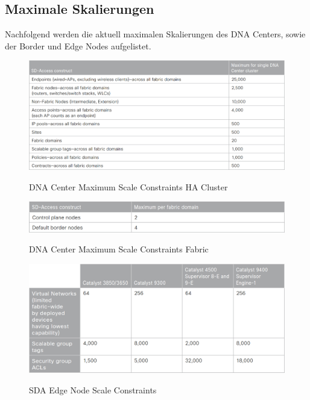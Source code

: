 \subsection{Maximale Skalierungen}
Nachfolgend werden die aktuell maximalen Skalierungen des DNA Centers, sowie der Border und Edge Nodes aufgelistet.
\begin{figure}[H]
	\centering
	\includegraphics[width=1\linewidth]{img/MaximumScale-HACluster.png}\\[1px]
	\caption{DNA Center Maximum Scale Constraints HA Cluster}
	\label{fig:Maximum Scale HACluster}
\end{figure}

\begin{figure}[H]
	\centering
	\includegraphics[width=1\linewidth]{img/MaximumScale-Fabric.png}\\[1px]
	\caption{DNA Center Maximum Scale Constraints Fabric}
	\label{fig:Maximum Scale Fabric}
\end{figure}

\begin{figure}[H]
	\centering
	\includegraphics[width=1\linewidth]{img/MaximumScale-EdgeNode.png}\\[1px]
	\caption{SDA Edge Node Scale Constraints}
	\label{fig:SDA Edge Node Scale Constraints}
\end{figure}

